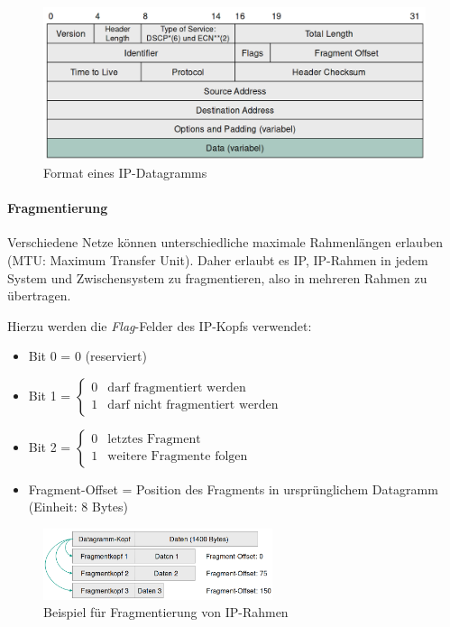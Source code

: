 \documentclass[a4paper, 14pt]{article}
\begin{document}
	\begin{figure}
		\includegraphics[width=\textwidth]{images/05-ip-datagram.png}
		\caption{Format eines IP-Datagramms}
	\end{figure}

	\paragraph{Fragmentierung}

	Verschiedene Netze können unterschiedliche maximale Rahmenlängen erlauben (MTU: Maximum Transfer Unit).
	Daher erlaubt es IP, IP-Rahmen in jedem System und Zwischensystem zu fragmentieren, also in mehreren Rahmen zu übertragen.
	
	Hierzu werden die \emph{Flag}-Felder des IP-Kopfs verwendet:

	\begin{itemize}
		\item Bit 0 = 0 (reserviert)
		\item Bit 1 = $\begin{cases} 0 & \text{darf fragmentiert werden} \\ 1 & \text{darf nicht fragmentiert werden} \end{cases}$
		\item Bit 2 = $\begin{cases} 0 & \text{letztes Fragment} \\ 1 & \text{weitere Fragmente folgen} \end{cases}$
		\item Fragment-Offset = Position des Fragments in ursprünglichem Datagramm (Einheit: 8 Bytes)
	\end{itemize}

	\begin{figure}
		\begin{center}
			\includegraphics[width=0.6\textwidth]{images/05-ip-fragmentation.png}
		\end{center}
		\caption{Beispiel für Fragmentierung von IP-Rahmen}
	\end{figure}
\end{document}
